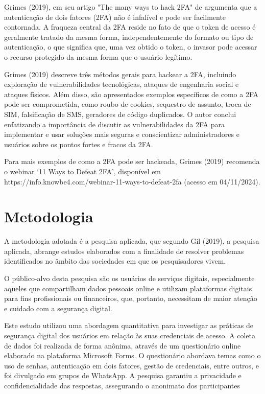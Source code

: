 \documentclass[12pt]{article}
\begin{document}
Grimes (2019), em seu artigo "The many ways to hack 2FA" de argumenta que a
autenticação de dois fatores (2FA) não é infalível e pode ser facilmente
contornada.
A fraqueza central da 2FA reside no fato de que o token de acesso é
geralmente tratado da mesma forma, independentemente do formato ou tipo de
autenticação, o que significa que, uma vez obtido o token, o invasor pode
acessar o recurso protegido da mesma forma que o usuário legítimo.


Grimes (2019) descreve três métodos gerais para hackear a 2FA, incluindo
exploração de vulnerabilidades tecnológicas, ataques de engenharia social
e ataques físicos.
Além disso, são apresentados exemplos específicos de como a 2FA pode ser
comprometida, como roubo de cookies, sequestro de assunto, troca de SIM,
falsificação de SMS, geradores de código duplicados.
O autor conclui enfatizando a importância de discutir
as vulnerabilidades da 2FA para implementar e usar soluções mais seguras
e conscientizar administradores e usuários sobre os pontos fortes e fracos
da 2FA.

Para mais exemplos de como a 2FA pode ser hackeada, Grimes (2019) recomenda
o webinar ‘11 Ways to Defeat 2FA’, disponível em
https://info.knowbe4.com/webinar-11-ways-to-defeat-2fa (acesso em 04/11/2024).

\section{Metodologia}

A metodologia adotada é a pesquisa aplicada, que segundo Gil (2019), a
pesquisa aplicada, abrange estudos elaborados com a finalidade de resolver
problemas identificados no âmbito das sociedades em que os pesquisadores
vivem.

O público-alvo desta pesquisa são os usuários de serviços digitais,
especialmente aqueles que compartilham dados pessoais online e utilizam
plataformas digitais para fins profissionais ou financeiros, que, portanto,
necessitam de maior atenção e cuidado com a segurança digital.


Este estudo utilizou uma abordagem quantitativa para investigar as práticas
de segurança digital dos usuários em relação às suas credenciais de acesso.
A coleta de dados foi realizada de forma anônima, através de um questionário
online elaborado na plataforma Microsoft Forms.
O questionário abordava temas como o uso de senhas, autenticação em dois
fatores, gestão de credenciais, entre outros, e foi divulgado em grupos de
WhatsApp.
A pesquisa garantiu a privacidade e
confidencialidade das respostas, assegurando o anonimato dos participantes
\end{document}
